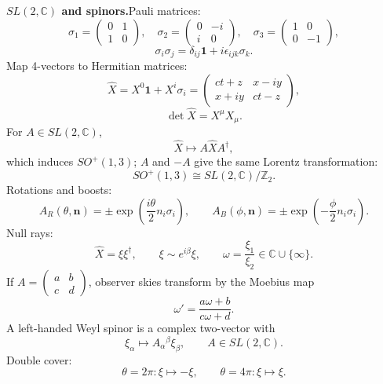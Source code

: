 \noindent\textbf{$SL(2,\mathbb C)$ and spinors.}\quad Pauli matrices:
\[
  \sigma_1=\begin{pmatrix}0&1\\1&0\end{pmatrix},\quad
  \sigma_2=\begin{pmatrix}0&-i\\i&0\end{pmatrix},\quad
  \sigma_3=\begin{pmatrix}1&0\\0&-1\end{pmatrix},
\]
\[
  \sigma_i\sigma_j=\delta_{ij}\mathbf1+i\epsilon_{ijk}\sigma_k.
\]
Map 4-vectors to Hermitian matrices:
\[
  \widehat X=X^0\mathbf1+X^i\sigma_i
  =
  \begin{pmatrix}ct+z&x-iy\\x+iy&ct-z\end{pmatrix},
\]
\[
  \det\widehat X=X^\mu X_\mu.
\]
For $A\in SL(2,\mathbb C)$,
\[
  \boxed{\widehat X\mapsto A\widehat X A^\dagger},
\]
which induces $SO^+(1,3)$; $A$ and $-A$ give the same Lorentz transformation:
\[
  SO^+(1,3)\cong SL(2,\mathbb C)/\mathbb Z_2.
\]
Rotations and boosts:
\[
  A_R(\theta,\mathbf n)=\pm\exp\left(\frac{i\theta}{2}n_i\sigma_i\right),\qquad
  A_B(\phi,\mathbf n)=\pm\exp\left(-\frac{\phi}{2}n_i\sigma_i\right).
\]
Null rays:
\[
  \widehat X=\xi\xi^\dagger,\qquad \xi\sim e^{i\beta}\xi,\qquad
  \omega=\frac{\xi_1}{\xi_2}\in\mathbb C\cup\{\infty\}.
\]
If $A=\begin{pmatrix}a&b\\c&d\end{pmatrix}$, observer skies transform by the
Moebius map
\[
  \boxed{\omega'=\frac{a\omega+b}{c\omega+d}}.
\]
A left-handed Weyl spinor is a complex two-vector with
\[
  \xi_\alpha\mapsto A_\alpha{}^\beta\xi_\beta,\qquad A\in SL(2,\mathbb C).
\]
Double cover:
\[
  \theta=2\pi:\xi\mapsto-\xi,\qquad
  \theta=4\pi:\xi\mapsto\xi.
\]
